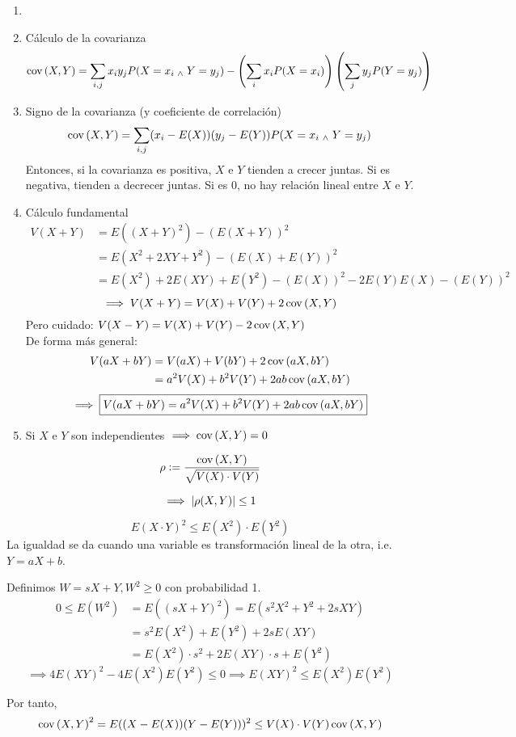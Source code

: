 \begin{obs}
	\begin{enumerate}
		\item[]
		\item Cálculo de la covarianza
		\[\operatorname{cov}\left(X, Y\right) = \sum_{i,j}x_iy_jP(X=x_i \; _{\wedge} \; Y=y_j) - \left(\sum_{i} x_iP(X=x_i)\right)\left(\sum_{j} y_jP(Y=y_j)\right)\]
		\item Signo de la covarianza (y coeficiente de correlación)
		\[\operatorname{cov}\left(X, Y\right) = \sum_{i,j}(x_i-E(X))(y_j-E(Y))P(X=x_i \; _{\wedge} \; Y=y_j)\]
		Entonces, si la covarianza es positiva, $X$ e $Y$ tienden a crecer juntas. Si es negativa, tienden a decrecer juntas. Si es 0, no hay relación lineal entre $X$ e $Y$.
		\item Cálculo fundamental
		\begin{align*}
			V(X+ Y) &= E((X+Y)^2)- (E(X+Y))^2 \\
			&= E(X^2+2XY+Y^2)- (E(X)+E(Y))^2 \\
			&= E(X^2)+2E(XY)+E(Y^2)- (E(X))^2-2E(Y)E(X) - (E(Y))^2
		\end{align*}
		\[\implies V(X+ Y) = V(X) + V(Y) + 2\operatorname{cov}\left(X, Y\right)\]
		Pero cuidado: $V(X-Y)=V(X) + V(Y) -2\operatorname{cov}\left(X, Y\right)$ \\
		De forma más general:
		\begin{align*}
			V(aX+ bY) &= V(aX) + V(bY) + 2\operatorname{cov}\left(aX, bY\right) \\
			&= a^2V(X) + b^2V(Y) + 2ab\operatorname{cov}\left(aX, bY\right)
		\end{align*}
		\[\implies \boxed{V(aX+ bY)=a^2V(X) + b^2V(Y) + 2ab\operatorname{cov}\left(aX, bY\right)}\]
		\item Si $X$ e $Y$ son independientes $\implies \operatorname{cov}\left(X, Y\right)=0$
	\end{enumerate}
\end{obs}

\begin{defn}
	\[\rho\vcentcolon= \frac{\operatorname{cov}\left(X, Y\right)}{\sqrt{V(X)\cdot V(Y)}}\]
\end{defn}
\[\implies \left|\rho(X, Y)\right| \leq 1\]
\begin{prop}
	\[E(X\cdot Y)^2 \leq E(X^2)\cdot E(Y^2)\]
	La igualdad se da cuando una variable es transformación lineal de la otra, i.e. $Y=aX+b$.
	\begin{dem}
		Definimos $W=sX+Y, W^2\geq 0$ con probabilidad 1.
		\begin{align*}
			0  \leq E\left(W^2\right)&=E\left((sX+Y)^2\right)=E\left(s^2X^2+Y^2+2sXY\right) \\
			&= s^2E\left(X^2\right)+E\left(Y^2\right)+2sE(XY) \\
			&= E(X^2)\cdot s^2+2E(XY)\cdot s+E(Y^2) 
		\end{align*}
		\[\implies 4E(XY)^2-4E\left(X^2\right)E\left(Y^2\right)\leq 0 \implies E(XY)^2\leq E\left(X^2\right)E\left(Y^2\right)\]
	\end{dem}
\end{prop}
Por tanto,
\[\operatorname{cov}\left(X, Y\right)^2 = E((X-E(X))(Y-E(Y)))^2 \leq V(X)\cdot V(Y)\operatorname{cov}\left(X, Y\right)\]